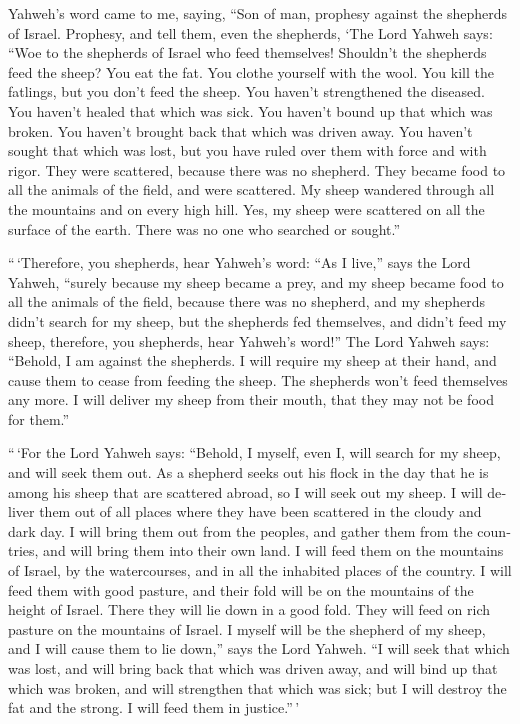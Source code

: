 \begin{paracol}{2}
\begin{otherlanguage}{english}
 Yahweh's word came to me, saying,  ``Son of
man, prophesy against the shepherds of Israel. Prophesy, and tell them,
even the shepherds, `The Lord Yahweh says: ``Woe to the shepherds of
Israel who feed themselves! Shouldn't the shepherds feed the sheep?
 You eat the fat. You clothe yourself with the wool. You
kill the fatlings, but you don't feed the sheep.  You
haven't strengthened the diseased. You haven't healed that which was
sick. You haven't bound up that which was broken. You haven't brought
back that which was driven away. You haven't sought that which was lost,
but you have ruled over them with force and with rigor. 
They were scattered, because there was no shepherd. They became food to
all the animals of the field, and were scattered.  My
sheep wandered through all the mountains and on every high hill. Yes, my
sheep were scattered on all the surface of the earth. There was no one
who searched or sought.''

 ``\,`Therefore, you shepherds, hear Yahweh's word:
 ``As I live,'' says the Lord Yahweh, ``surely because my
sheep became a prey, and my sheep became food to all the animals of the
field, because there was no shepherd, and my shepherds didn't search for
my sheep, but the shepherds fed themselves, and didn't feed my sheep,
 therefore, you shepherds, hear Yahweh's word!''
 The Lord Yahweh says: ``Behold, I am against the
shepherds. I will require my sheep at their hand, and cause them to
cease from feeding the sheep. The shepherds won't feed themselves any
more. I will deliver my sheep from their mouth, that they may not be
food for them.''

 ``\,`For the Lord Yahweh says: ``Behold, I myself, even
I, will search for my sheep, and will seek them out.  As
a shepherd seeks out his flock in the day that he is among his sheep
that are scattered abroad, so I will seek out my sheep. I will deliver
them out of all places where they have been scattered in the cloudy and
dark day.  I will bring them out from the peoples, and
gather them from the countries, and will bring them into their own land.
I will feed them on the mountains of Israel, by the watercourses, and in
all the inhabited places of the country.  I will feed
them with good pasture, and their fold will be on the mountains of the
height of Israel. There they will lie down in a good fold. They will
feed on rich pasture on the mountains of Israel.  I
myself will be the shepherd of my sheep, and I will cause them to lie
down,'' says the Lord Yahweh.  ``I will seek that which
was lost, and will bring back that which was driven away, and will bind
up that which was broken, and will strengthen that which was sick; but I
will destroy the fat and the strong. I will feed them in justice.''\,'


\end{otherlanguage}
\end{paracol}
